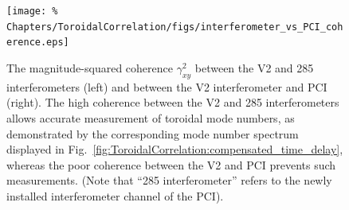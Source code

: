 \begin{figure}[h!]
  \centering
  \texttt{[image: \%
    Chapters/ToroidalCorrelation/figs/interferometer\_vs\_PCI\_coherence.eps]}
  \caption[Inability to correlate V2 and PCI]{%
    The magnitude-squared coherence $\gamma_{xy}^2$ between
    the V2 and 285 interferometers (left) and
    between the V2 interferometer and PCI (right).
    The high coherence between the V2 and 285 interferometers
    allows accurate measurement of toroidal mode numbers,
    as demonstrated by the corresponding mode number spectrum
    displayed in Fig.~\ref{fig:ToroidalCorrelation:compensated_time_delay},
    whereas the poor coherence between the V2 and PCI
    prevents such measurements.
    (Note that ``285 interferometer'' refers to
    the newly installed interferometer channel of the PCI).}
\label{fig:ToroidalCorrelation:PCI_coherence}
\end{figure}




